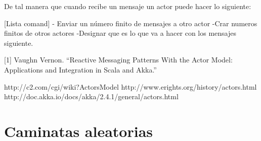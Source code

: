 De tal manera que cuando recibe un mensaje un actor  puede hacer lo siguiente:

[Lista  comand]
- Enviar un n\'umero finito de mensajes a otro actor
-Crar numeros finitos de otros actores
-Designar  que es lo que  va a hacer con los mensajes siguiente.



[1] Vaughn Vernon. “Reactive Messaging Patterns With the Actor Model: Applications and Integration in Scala and Akka.” 

http://c2.com/cgi/wiki?ActorsModel
http://www.erights.org/history/actors.html
http://doc.akka.io/docs/akka/2.4.1/general/actors.html

\section {Caminatas aleatorias}
